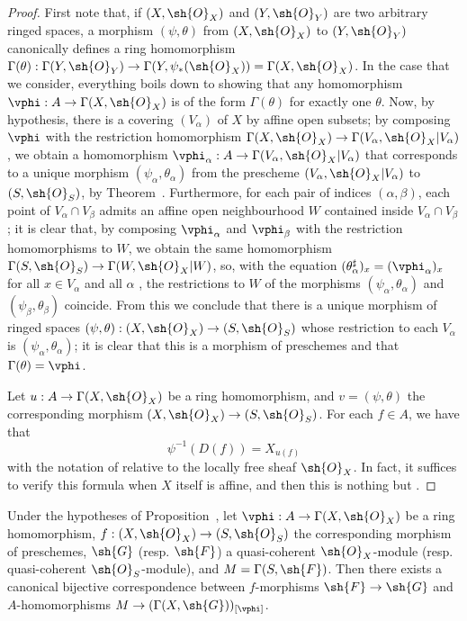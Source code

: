 \begin{proof}
First note that, if $(X,\sh{O}_X)$ and $(Y,\sh{O}_Y)$ are two arbitrary ringed spaces,
a morphism $(\psi,\theta)$ from $(X,\sh{O}_X)$ to $(Y,\sh{O}_Y)$ canonically defines a ring homomorphism $\Gamma(\theta):\Gamma(Y,\sh{O}_Y)\to\Gamma(Y,\psi_*(\sh{O}_X))=\Gamma(X,\sh{O}_X)$.
In the case that we consider, everything boils down to showing that any homomorphism $\vphi:A\to\Gamma(X,\sh{O}_X)$ is of the form $\Gamma(\theta)$ for exactly one $\theta$.
Now, by hypothesis, there is a covering $(V_\alpha)$ of $X$ by affine open subsets;
by composing $\vphi$ with the restriction homomorphism $\Gamma(X,\sh{O}_X)\to\Gamma(V_\alpha,\sh{O}_X|V_\alpha)$, we obtain a homomorphism $\vphi_\alpha:A\to\Gamma(V_\alpha,\sh{O}_X|V_\alpha)$ that corresponds to a unique morphism $(\psi_\alpha,\theta_\alpha)$ from the prescheme $(V_\alpha,\sh{O}_X|V_\alpha)$ to $(S,\sh{O}_S)$, by Theorem~.
Furthermore, for each pair of indices $(\alpha,\beta)$, each point of $V_\alpha\cap V_\beta$ admits an affine open neighbourhood $W$ contained inside $V_\alpha\cap V_\beta$ ;
it is clear that, by composing $\vphi_\alpha$ and $\vphi_\beta$ with the restriction homomorphisms to $W$, we obtain the same homomorphism $\Gamma(S,\sh{O}_S)\to\Gamma(W,\sh{O}_X|W)$, so, with the equation $(\theta_\alpha^\sharp)_x=(\vphi_\alpha)_x$ for all $x\in V_\alpha$ and all $\alpha$ , the restrictions to $W$ of the morphisms $(\psi_\alpha,\theta_\alpha)$ and $(\psi_\beta,\theta_\beta)$ coincide.
From this we conclude that there is a unique morphism of ringed spaces $(\psi,\theta):(X,\sh{O}_X)\to(S,\sh{O}_S)$ whose restriction to each $V_\alpha$ is $(\psi_\alpha,\theta_\alpha)$; it is clear that this is a morphism of preschemes and that $\Gamma(\theta)=\vphi$.

Let $u:A\to\Gamma(X,\sh{O}_X)$ be a ring homomorphism, and $v=(\psi,\theta)$ the corresponding morphism $(X,\sh{O}_X)\to(S,\sh{O}_S)$.
For each $f\in A$, we have that
\[
  \label{I.2.2.4.1}
  \psi^{-1}(D(f))=X_{u(f)}
  \tag{2.2.4.1}
\]
with the notation of  relative to the locally free sheaf $\sh{O}_X$.
In fact, it suffices to verify this formula when $X$ itself is affine, and then this is nothing but .
\end{proof}

\begin{proposition}[2.2.5]
\label{I.2.2.5}
Under the hypotheses of Proposition~, let $\vphi:A\to\Gamma(X,\sh{O}_X)$ be a ring homomorphism, $f:(X,\sh{O}_X)\to(S,\sh{O}_S)$ the corresponding morphism of preschemes, $\sh{G}$ (resp. $\sh{F}$) a quasi-coherent $\sh{O}_X$-module (resp. quasi-coherent $\sh{O}_S$-module), and $M=\Gamma(S,\sh{F})$.
Then there exists a canonical bijective
correspondence between $f$-morphisms $\sh{F}\to\sh{G}$  and $A$-homomorphisms $M\to(\Gamma(X,\sh{G}))_{[\vphi]}$.
\end{proposition}

